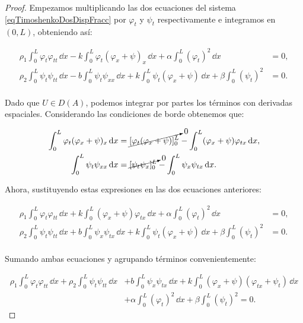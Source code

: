 \begin{proof}
    Empezamos multiplicando las dos ecuaciones del sistema \eqref{eqTimoshenkoDosDispFracc} por $\varphi_t$ y $\psi_t$ respectivamente e integramos en $(0,L)$, obteniendo así:

    \begin{align*}
        \rho_1 \int_0^L \varphi_t\varphi_{tt}\, \dd x - k\int_0^L\varphi_t(\varphi_x + \psi)_x \, \dd x + \alpha\int_0^L(\varphi_t)^2 \, \dd x &= 0,\\
        \rho_2 \int_0^L\psi_t\psi_{tt} \, \dd x - b\int_0^L \psi_t\psi_{xx} \, \dd x + k \int_0^L \psi_t(\varphi_x + \psi) \, \dd x + \beta\int_0^L (\psi_t)^2 &= 0.\\
    \end{align*}

    Dado que $U \in D(A)$, podemos integrar por partes los términos con derivadas espaciales. Considerando las condiciones de borde obtenemos que:

    \begin{align*}
        \int_0^L\varphi_t(\varphi_x + \psi)_x \, \mathrm{d} x &= \cancelto{0}{[\varphi_t(\varphi_x + \psi)]_0^L} - \int_0^L(\varphi_x + \psi)\varphi_{tx} \, \mathrm{d} x,\\
        \int_0^L \psi_t\psi_{xx} \, \mathrm{d} x &= \cancelto{0}{[\psi_t\psi_x]_0^L} - \int_0^L \psi_x \psi_{tx} \, \mathrm{d} x.
    \end{align*}

    Ahora, sustituyendo estas expresiones en las dos ecuaciones anteriores:

    \begin{align*}
        \rho_1 \int_0^L \varphi_t\varphi_{tt}\, \dd x + k\int_0^L(\varphi_x + \psi)\varphi_{tx} \, \dd x + \alpha\int_0^L(\varphi_t)^2 \, \dd x &= 0,\\
        \rho_2 \int_0^L\psi_t\psi_{tt} \, \dd x + b\int_0^L \psi_x \psi_{tx} \, \dd x + k \int_0^L \psi_t(\varphi_x + \psi) \, \dd x + \beta\int_0^L (\psi_t)^2 &= 0.\\
    \end{align*}

    Sumando ambas ecuaciones y agrupando términos convenientemente:

    \begin{align*}
        \rho_1 \int_0^L \varphi_t\varphi_{tt}\, \dd x + \rho_2 \int_0^L\psi_t\psi_{tt} \, \dd x &+ b\int_0^L \psi_x \psi_{tx} \, \dd x + k \int_0^L (\varphi_x + \psi)(\varphi_{tx} + \psi_t) \, \dd x\\
        &+ \alpha\int_0^L(\varphi_t)^2 \, \dd x + \beta\int_0^L (\psi_t)^2 = 0.
    \end{align*}


\end{proof}
